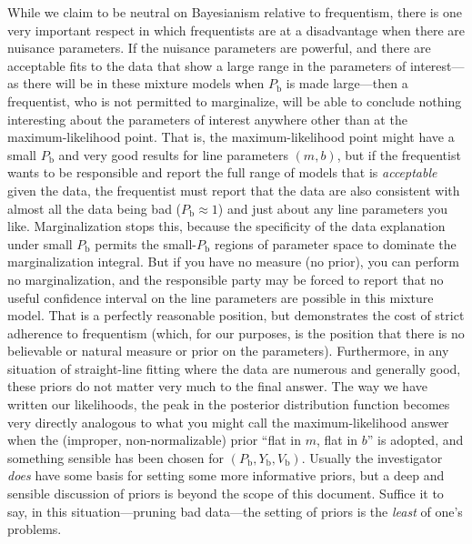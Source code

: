 \documentclass[12pt,twoside,pdftex]{article}
\newcommand{\documentname}{document}
\newcounter{problem}
\newcommand{\Pbad}{P_{\mathrm{b}}}
\newcommand{\Ybad}{Y_{\mathrm{b}}}
\newcommand{\Vbad}{V_{\mathrm{b}}}
\begin{document}
{  While we claim to be neutral on Bayesianism relative to frequentism,
  there is one very important respect in which frequentists are at a
  disadvantage when there are nuisance parameters.  If the nuisance
  parameters are powerful, and there are acceptable fits to the data
  that show a large range in the parameters of interest---as there
  will be in these mixture models when $\Pbad$ is made large---then a
  frequentist, who is not permitted to marginalize, will be able to
  conclude nothing interesting about the parameters of interest
  anywhere other than at the maximum-likelihood point.  That is, the
  maximum-likelihood point might have a small $\Pbad$ and very good
  results for line parameters $(m,b)$, but if the frequentist wants to
  be responsible and report the full range of models that is
  \emph{acceptable} given the data, the frequentist must report that
  the data are also consistent with almost all the data being bad
  ($\Pbad\approx 1$) and just about any line parameters you like.
  Marginalization stops this, because the specificity of the data
  explanation under small $\Pbad$ permits the small-$\Pbad$ regions of
  parameter space to dominate the marginalization integral.  But if
  you have no measure (no prior), you can perform no marginalization,
  and the responsible party may be forced to report that no useful
  confidence interval on the line parameters are possible in this
  mixture model.  That is a perfectly reasonable position, but
  demonstrates the cost of strict adherence to frequentism (which, for
  our purposes, is the position that there is no believable or natural
  measure or prior on the parameters).}  Furthermore, in any situation
of straight-line fitting where the data are numerous and generally
good, these priors do not matter very much to the final answer.  The
way we have written our likelihoods, the peak in the posterior
distribution function becomes very directly analogous to what you
might call the maximum-likelihood answer when the (improper,
non-normalizable) prior ``flat in $m$, flat in $b$'' is adopted, and
something sensible has been chosen for $(\Pbad,\Ybad,\Vbad)$.  Usually
the investigator \emph{does} have some basis for setting some more
informative priors, but a deep and sensible discussion of priors is
beyond the scope of this \documentname.  Suffice it to say, in this
situation---pruning bad data---the setting of priors is the
\emph{least} of one's problems.
\end{document}
